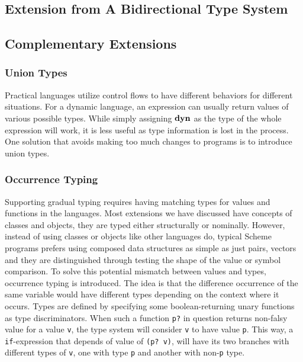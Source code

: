 \subsection{Extension from A Bidirectional Type System}


\subsection{Complementary Extensions}

\subsubsection{Union Types}

Practical languages utilize control flows to have different behaviors for different situations.
For a dynamic language, an expression can usually return values of various possible types.
While simply assigning $\textbf{dyn}$ as the type of the whole expression will work,
it is less useful as type information is lost in the process.
One solution that avoids making too much changes to programs is to introduce union types.

\subsubsection{Occurrence Typing}


Supporting gradual typing requires having matching types for values and functions in the languages.
Most extensions we have discussed have concepts of classes and objects, they are typed either
structurally or nominally.
However, instead of using classes or objects like other languages do,
typical Scheme programs prefers using composed data structures as simple as just pairs, vectors
and they are distinguished through testing the shape of the value or
symbol comparison.
To solve this potential mismatch between values and types, occurrence typing is introduced.
The idea is that the difference occurrence of the same variable would have different types
depending on the context where it occurs.
Types are defined by specifying some boolean-returning unary functions as type discriminators.
When such a function \texttt{p?} in question returns non-falsy value for a value \texttt{v},
the type system will consider \texttt{v} to have value \texttt{p}.
This way, a \texttt{if}-expression that depends of value of \texttt{(p? v)},
will have its two branches with different types of \texttt{v}, one with type \texttt{p}
and another with non-\texttt{p} type.

